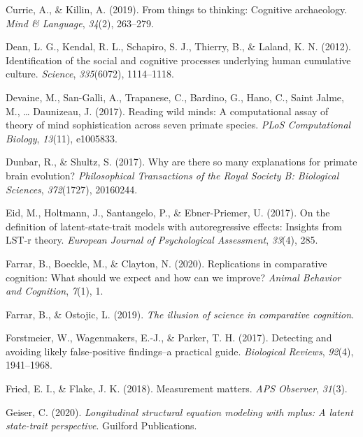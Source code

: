 \documentclass[
  man,floatsintext]{apa6}
\newlength{\cslhangindent}
\newlength{\cslentryspacingunit} %
\newenvironment{CSLReferences}[2] %
 {%
  \setlength{\parindent}{0pt}
  \ifodd #1
  \let\oldpar\par
  \def\par{\hangindent=\cslhangindent\oldpar}
  \fi
  \setlength{\parskip}{#2\cslentryspacingunit}
 }%
 {}
\begin{document}
\begin{CSLReferences}{1}{0}
\leavevmode{}%
Currie, A., \& Killin, A. (2019). From things to thinking: Cognitive archaeology. \emph{Mind \& Language}, \emph{34}(2), 263--279.

\leavevmode{}%
Dean, L. G., Kendal, R. L., Schapiro, S. J., Thierry, B., \& Laland, K. N. (2012). Identification of the social and cognitive processes underlying human cumulative culture. \emph{Science}, \emph{335}(6072), 1114--1118.

\leavevmode{}%
Devaine, M., San-Galli, A., Trapanese, C., Bardino, G., Hano, C., Saint Jalme, M., \ldots{} Daunizeau, J. (2017). Reading wild minds: A computational assay of theory of mind sophistication across seven primate species. \emph{PLoS Computational Biology}, \emph{13}(11), e1005833.

\leavevmode{}%
Dunbar, R., \& Shultz, S. (2017). Why are there so many explanations for primate brain evolution? \emph{Philosophical Transactions of the Royal Society B: Biological Sciences}, \emph{372}(1727), 20160244.

\leavevmode{}%
Eid, M., Holtmann, J., Santangelo, P., \& Ebner-Priemer, U. (2017). On the definition of latent-state-trait models with autoregressive effects: Insights from LST-r theory. \emph{European Journal of Psychological Assessment}, \emph{33}(4), 285.

\leavevmode{}%
Farrar, B., Boeckle, M., \& Clayton, N. (2020). Replications in comparative cognition: What should we expect and how can we improve? \emph{Animal Behavior and Cognition}, \emph{7}(1), 1.

\leavevmode{}%
Farrar, B., \& Ostojic, L. (2019). \emph{The illusion of science in comparative cognition}.

\leavevmode{}%
Forstmeier, W., Wagenmakers, E.-J., \& Parker, T. H. (2017). Detecting and avoiding likely false-positive findings--a practical guide. \emph{Biological Reviews}, \emph{92}(4), 1941--1968.

\leavevmode{}%
Fried, E. I., \& Flake, J. K. (2018). Measurement matters. \emph{APS Observer}, \emph{31}(3).

\leavevmode{}%
Geiser, C. (2020). \emph{Longitudinal structural equation modeling with mplus: A latent state-trait perspective}. Guilford Publications.


\end{CSLReferences}
\end{document}
